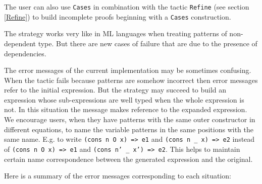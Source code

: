 The user can also use \texttt{Cases} in combination with the tactic
\texttt{Refine} (see section \ref{Refine}) to build incomplete proofs
beginning with a \texttt{Cases} construction.

\label{limitations}
The strategy works very like in ML languages when treating
patterns of non-dependent type.  
But there are new cases of failure that are due to the presence of 
dependencies. 

The error messages of the current implementation may be sometimes
confusing.  When the tactic fails because patterns are somehow
incorrect then error messages refer to the initial expression. But the
strategy may succeed to build an expression whose sub-expressions are
well typed when the whole expression is not. In this situation the
message makes reference to the expanded expression.  We encourage
users, when they have patterns with the same outer constructor in
different equations, to name the variable patterns in the same
positions with the same name.  
E.g. to write {\small\texttt{(cons n O x) => e1}} 
and {\small\texttt{(cons n \_ x) => e2}} instead of
{\small\texttt{(cons n O x) => e1}} and 
{\small\texttt{(cons n' \_ x') => e2}}. 
This helps to maintain certain name correspondence between the
generated expression and the original.

Here is a summary of the error messages corresponding to each situation:

